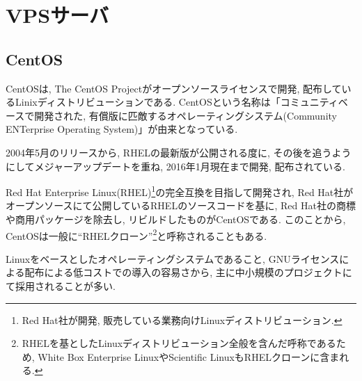 \section{VPSサーバ}
\subsection{CentOS}
CentOSは, The CentOS Projectがオープンソースライセンスで開発, 配布しているLinixディストリビューションである.
CentOSという名称は「コミュニティベースで開発された, 有償版に匹敵するオペレーティングシステム(Community ENTerprise Operating System)」が由来となっている.

2004年5月のリリースから, RHELの最新版が公開される度に, その後を追うようにしてメジャーアップデートを重ね, 2016年1月現在まで開発, 配布されている.

Red Hat Enterprise Linux(RHEL)\footnote{Red Hat社が開発, 販売している業務向けLinuxディストリビューション.}の完全互換を目指して開発され, Red Hat社がオープンソースにて公開しているRHELのソースコードを基に, Red Hat社の商標や商用パッケージを除去し, リビルドしたものがCentOSである.
このことから, CentOSは一般に“RHELクローン”\footnote{RHELを基としたLinuxディストリビューション全般を含んだ呼称であるため, White Box Enterprise LinuxやScientific LinuxもRHELクローンに含まれる.}と呼称されることもある.

Linuxをベースとしたオペレーティングシステムであること, GNUライセンスによる配布による低コストでの導入の容易さから, 主に中小規模のプロジェクトにて採用されることが多い.
